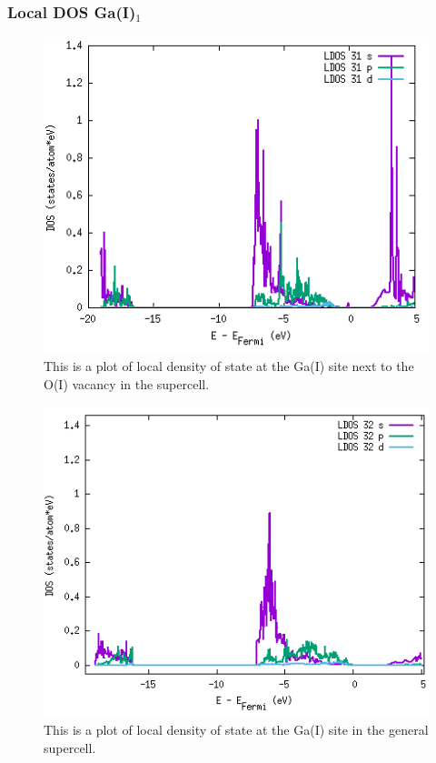 \subsubsection{Local DOS Ga(I)$_1$}

\begin{figure}[H]
\includegraphics[width=\linewidth]{../fig/dosplot/ldos_Ga_I_OI_vac_nabo}\caption{This is a plot of local density of state at the Ga(I) site next to the O(I) vacancy in the supercell.}\label{fig:ldos_Ga_I_nabo}
\end{figure}

\begin{figure}[H]
\includegraphics[width=\linewidth]{../fig/dosplot/ldos_Ga_I_supercell}\caption{This is a plot of local density of state at the Ga(I) site in the general supercell.}\label{fig:ldos_Ga_I_supercell}
\end{figure}

